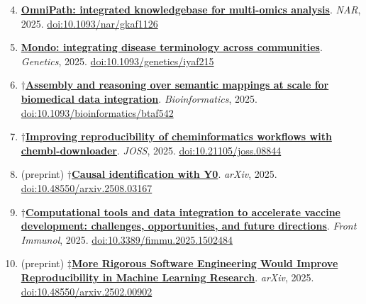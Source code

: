 \documentclass[10pt,a4paper,sans]{moderncv} %
\newcommand{\wikidata}[2]{\href{https://bioregistry.io/wikidata:#1?provider=scholia}{{#2}}}
\begin{document}
    \begin{enumerate}
    \setcounter{enumi}{3}
    \itemsep0.5em
        \item
        \wikidata{Q139986563}{\textbf{OmniPath: integrated knowledgebase for multi-omics analysis}}.
    \textit{NAR}, 2025.  {\scriptsize \href{https://bioregistry.io/doi:10.1093/NAR/GKAF1126}{doi:10.1093/nar/gkaf1126}}
        \item
        \wikidata{Q139986559}{\textbf{Mondo: integrating disease terminology across communities}}.
    \textit{Genetics}, 2025.  {\scriptsize \href{https://bioregistry.io/doi:10.1093/GENETICS/IYAF215}{doi:10.1093/genetics/iyaf215}}
        \item
        $\dagger$\wikidata{Q136408428}{\textbf{Assembly and reasoning over semantic mappings at scale for biomedical data integration}}.
    \textit{Bioinformatics}, 2025.  {\scriptsize \href{https://bioregistry.io/doi:10.1093/BIOINFORMATICS/BTAF542}{doi:10.1093/bioinformatics/btaf542}}
        \item
        $\dagger$\wikidata{Q136308907}{\textbf{Improving reproducibility of cheminformatics workflows with chembl-downloader}}.
    \textit{JOSS}, 2025.  {\scriptsize \href{https://bioregistry.io/doi:10.21105/JOSS.08844}{doi:10.21105/joss.08844}}
        \item
        (preprint) $\dagger$\wikidata{Q135651916}{\textbf{Causal identification with Y0}}.
    \textit{arXiv}, 2025.  {\scriptsize \href{https://bioregistry.io/doi:10.48550/ARXIV.2508.03167}{doi:10.48550/arxiv.2508.03167}}
        \item
        $\dagger$\wikidata{Q134057794}{\textbf{Computational tools and data integration to accelerate vaccine development: challenges, opportunities, and future directions}}.
    \textit{Front Immunol}, 2025.  {\scriptsize \href{https://bioregistry.io/doi:10.3389/FIMMU.2025.1502484}{doi:10.3389/fimmu.2025.1502484}}
        \item
        (preprint) $\ddagger$\wikidata{Q136408639}{\textbf{More Rigorous Software Engineering Would Improve Reproducibility in Machine Learning Research}}.
    \textit{arXiv}, 2025.  {\scriptsize \href{https://bioregistry.io/doi:10.48550/ARXIV.2502.00902}{doi:10.48550/arxiv.2502.00902}}
    \end{enumerate}
\end{document}
